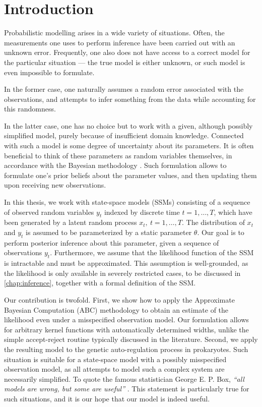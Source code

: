 \chapter{Introduction}
\label{chap:introduction}

Probabilistic modelling arises in a wide variety of situations. Often, the measurements one uses to perform inference have been carried out with an unknown error. Frequently, one also does not have access to a correct model for the particular situation --- the true model is either unknown, or such model is even impossible to formulate.

In the former case, one naturally assumes a random error associated with the observations, and attempts to infer something from the data while accounting for this randomness.

In the latter case, one has no choice but to work with a given, although possibly simplified model, purely because of insufficient domain knowledge. Connected with such a model is some degree of uncertainty about its parameters. It is often beneficial to think of these parameters as random variables themselves, in accordance with the Bayesian methodology \citep{bayes}. Such formulation allows to formulate one's prior beliefs about the parameter values, and then updating them upon receiving new observations.

In this thesis, we work with state-space models (SSMs) consisting of a sequence of observed random variables $y_t$ indexed by discrete time $t = 1, \ldots, T$, which have been generated by a latent random process $x_t,\ t = 1, \ldots, T$. The distribution of $x_t$ and $y_t$ is assumed to be parameterized by a static parameter $\theta$. Our goal is to perform posterior inference about this parameter, given a sequence of observations $y_t$. Furthermore, we assume that the likelihood function of the SSM is intractable and must be approximated. This assumption is well-grounded, as the likelihood is only available in severely restricted cases, to be discussed in \autoref{chap:inference}, together with a formal definition of the SSM.

Our contribution is twofold. First, we show how to apply the Approximate Bayesian Computation (ABC) methodology \citep{abc-old-old, abc-old} to obtain an estimate of the likelihood even under a misspecified observation model. Our formulation allows for arbitrary kernel functions with automatically determined widths, unlike the simple accept-reject routine typically discussed in the literature. Second, we apply the resulting model to the genetic auto-regulation process in prokaryotes. Such situation is suitable for a state-space model with a possibly misspecified observation model, as all attempts to model such a complex system are necessarily simplified. To quote the famous statistician George E. P. Box, \emph{``all models are wrong, but some are useful''} \citep{box-quote}. This statement is particularly true for such situations, and it is our hope that our model is indeed useful.

